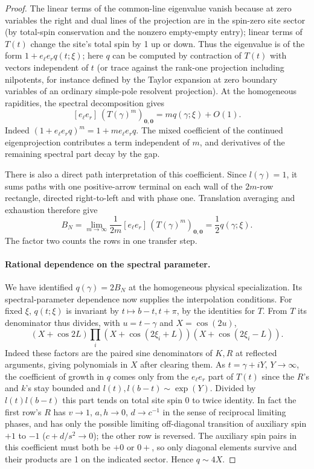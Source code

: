 \begin{proof}
The linear terms of the common-line eigenvalue vanish because at zero variables the right and dual lines of the projection are in the spin-zero site sector (by total-spin conservation and the nonzero empty-empty entry); linear terms of $T(t)$ change the site's total spin by 1 up or down. Thus the eigenvalue is of the form $1+e_\ell e_r q(t;\xi)$; here $q$ can be computed by contraction of $T(t)$ with vectors independent of $t$ (or trace against the rank-one projection including nilpotents, for instance defined by the Taylor expansion at zero boundary variables of an ordinary simple-pole resolvent projection). At the homogeneous rapidities, the spectral decomposition gives
\[
 [e_\ell e_r]\,(T(\gamma)^m)_{\mathbf0,\mathbf0}
 =m q(\gamma;\xi)+O(1).
\]
Indeed $(1+e_\ell e_rq)^m=1+m e_\ell e_rq$. The mixed coefficient of the continued eigenprojection contributes a term independent of $m$, and derivatives of the remaining spectral part decay by the gap.

There is also a direct path interpretation of this coefficient. Since $l(\gamma)=1$, it sums paths with one positive-arrow terminal on each wall of the $2m$-row rectangle, directed right-to-left and with phase one. Translation averaging and exhaustion therefore give
\[
 B_N=\lim_{m\to\infty}\frac{1}{2m}
 [e_\ell e_r]\,(T(\gamma)^m)_{\mathbf0,\mathbf0}
 =\frac12 q(\gamma;\xi).
\]
The factor two counts the rows in one transfer step.

\paragraph{Rational dependence on the spectral parameter.}
We have identified $q(\gamma)=2B_N$ at the homogeneous physical specialization. Its spectral-parameter dependence now supplies the interpolation conditions. For fixed $\xi$, $q(t;\xi)$ is invariant by $t\mapsto b-t,t+\pi$, by the identities for $T$. From $T$ its denominator thus divides, with $u=t-\gamma$ and $X=\cos(2u)$,
\[
 (X+\cos 2L)\prod_i (X+\cos(2\xi_i+L))(X+\cos(2\xi_i-L)).
\]
Indeed these factors are the paired sine denominators of $K,R$ at reflected arguments, giving polynomials in $X$ after clearing them. As $t=\gamma+iY$, $Y\to\infty$, the coefficient of growth in $q$ comes only from the $e_\ell e_r$ part of $T(t)$ since the $R$'s and $k$'s stay bounded and $l(t),l(b-t)\sim\exp(Y)$. Divided by $l(t)l(b-t)$ this part tends on total site spin 0 to twice identity. In fact the first row's $R$ has $v\to1$, $a,h\to0$, $d\to c^{-1}$ in the sense of reciprocal limiting phases, and has only the possible limiting off-diagonal transition of auxiliary spin $+1$ to $-1$ ($c+d/s^2\to0$); the other row is reversed. The auxiliary spin pairs in this coefficient must both be $+0$ or $0+$, so only diagonal elements survive and their products are 1 on the indicated sector. Hence $q\sim 4 X$.


\end{proof}
